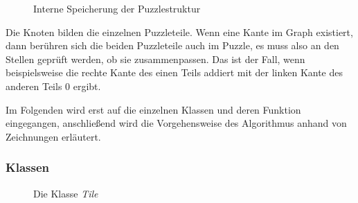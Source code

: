 \documentclass[a4paper, 12pt]{scrartcl}
\begin{document}
\begin{figure}[h]
\begin{subfigure}[t]{0.45\textwidth}
    \end{subfigure}
\hfill
    \begin{subfigure}[t]{0.45\textwidth}
    \centering


        \label{Graph1.1}
    \end{subfigure}
    \caption{Interne Speicherung der Puzzlestruktur}
    \label{Graph1}
\end{figure}

Die Knoten bilden die einzelnen Puzzleteile. Wenn eine Kante im Graph existiert, dann berühren sich die beiden Puzzleteile auch im Puzzle, es muss also an den Stellen geprüft werden, ob sie zusammenpassen. Das ist der Fall, wenn beispielsweise die rechte Kante des einen Teils addiert mit der linken Kante des anderen Teils 0 ergibt.

Im Folgenden wird erst auf die einzelnen Klassen und deren Funktion eingegangen, anschließend wird die Vorgehensweise des Algorithmus anhand von Zeichnungen erläutert.

\subsubsection{Klassen}
\begin{figure}[h]
    \centering
    \caption{Die Klasse \emph{Tile}}
    \label{tile}
\end{figure}
\end{document}
